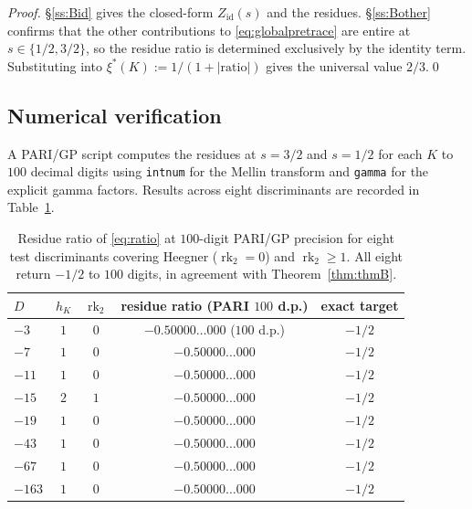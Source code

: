 \documentclass[11pt,a4paper,reqno]{amsart}
\theoremstyle{definition}
\DeclareMathOperator{\rk}{rk}
\newcommand{\xis}{\xi^{*}}
\begin{document}
\begin{proof}
\S\ref{ss:Bid} gives the closed-form $Z_{\mathrm{id}}(s)$ and the residues.
\S\ref{ss:Bother} confirms that the other contributions to
\eqref{eq:globalpretrace} are entire at $s\in\{1/2,3/2\}$, so the residue
ratio is determined exclusively by the identity term.  Substituting into
$\xis(K) := 1/(1+|\mathrm{ratio}|)$ gives the universal value $2/3$.\qed
\end{proof}

\subsection{Numerical verification}\label{ss:Bnumeric}

A PARI/GP script computes the residues at $s=3/2$ and $s=1/2$ for each $K$ to
$100$ decimal digits using \texttt{intnum} for the Mellin transform and
\texttt{gamma} for the explicit gamma factors.  Results across eight
discriminants are recorded in Table~\ref{tab:numeric}.

\begin{table}[h]
\centering
\begin{tabular}{lcccc}
\toprule
$D$    & $h_K$ & $\rk_2$ & residue ratio (PARI $100$ d.p.) & exact target \\
\midrule
$-3$    & $1$ & $0$ & $-0.50000\ldots000$ ($100$ d.p.) & $-1/2$ \\
$-7$    & $1$ & $0$ & $-0.50000\ldots000$ & $-1/2$ \\
$-11$   & $1$ & $0$ & $-0.50000\ldots000$ & $-1/2$ \\
$-15$   & $2$ & $1$ & $-0.50000\ldots000$ & $-1/2$ \\
$-19$   & $1$ & $0$ & $-0.50000\ldots000$ & $-1/2$ \\
$-43$   & $1$ & $0$ & $-0.50000\ldots000$ & $-1/2$ \\
$-67$   & $1$ & $0$ & $-0.50000\ldots000$ & $-1/2$ \\
$-163$  & $1$ & $0$ & $-0.50000\ldots000$ & $-1/2$ \\
\bottomrule
\end{tabular}
\caption{Residue ratio of \eqref{eq:ratio} at $100$-digit PARI/GP precision for
eight test discriminants covering Heegner ($\rk_2=0$) and $\rk_2\ge 1$.
All eight return $-1/2$ to $100$ digits, in agreement with
Theorem~\ref{thm:thmB}.}\label{tab:numeric}
\end{table}
\end{document}
